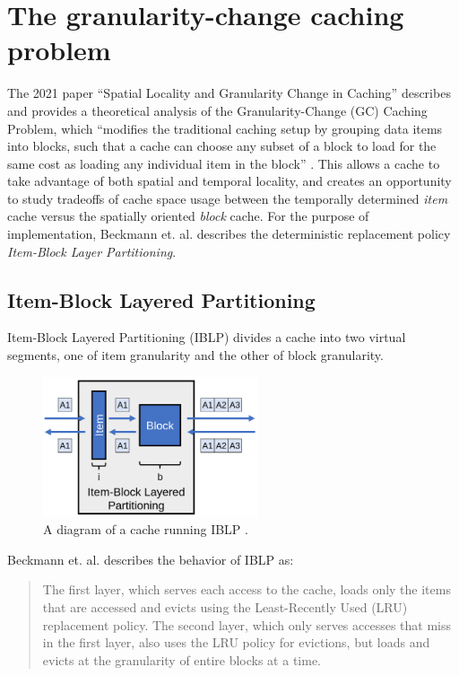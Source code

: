 \documentclass[12pt,twoside]{reedthesis}
\begin{document}
\section{The granularity-change caching problem}

The 2021 paper ``Spatial Locality and Granularity Change in Caching'' describes and provides a theoretical analysis of the Granularity-Change (GC) Caching Problem, which ``modifies the traditional caching setup by grouping data items into blocks, such that a cache can choose any subset of a block to load for the same cost as loading any individual item in the block'' \cite{beckmann}. This allows a cache to take advantage of both spatial and temporal locality, and creates an opportunity to study tradeoffs of cache space usage between the temporally determined \textit{item} cache versus the spatially oriented \textit{block} cache. For the purpose of implementation, Beckmann et. al. describes the deterministic replacement policy \textit{Item-Block Layer Partitioning}.

	\subsection*{Item-Block Layered Partitioning}

	Item-Block Layered Partitioning (IBLP) divides a cache into two virtual segments, one of item granularity and the other of block granularity.

	\begin{figure}[h]
		\centering
		\includegraphics[width=2.5in]{figures/IBLP.png}
		\caption{A diagram of a cache running IBLP \cite{beckmann}.}
	\end{figure}
	
	Beckmann et. al. describes the behavior of IBLP as: \begin{quote}
		The first layer, which serves each access to the cache, loads only the items that are accessed and evicts using the Least-Recently Used (LRU) replacement policy. The second layer, which only serves accesses that miss in the first layer, also uses the LRU policy for evictions, but loads and evicts at the granularity of entire blocks at a time. \cite{beckmann}
	\end{quote}
 
\end{document}
